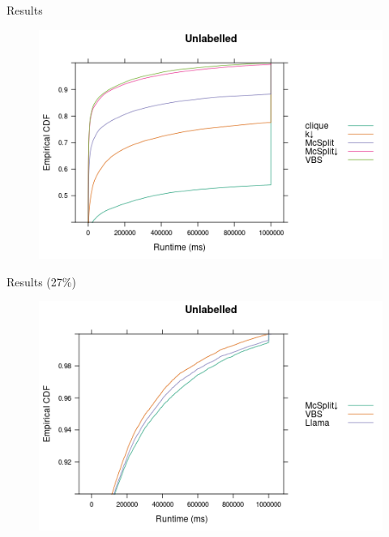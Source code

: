 \documentclass{beamer}
\begin{document}
\begin{frame}{Results}
  \begin{figure}
    \centering
    \includegraphics[width=\textwidth]{../dissertation/images/ecdf_unlabelled.png}
  \end{figure}
\end{frame}

\begin{frame}{Results (27\%)}
  \begin{figure}
    \centering
    \includegraphics[width=\textwidth]{../dissertation/images/ecdf_unlabelled_llama.png}
  \end{figure}
\end{frame}
\end{document}
